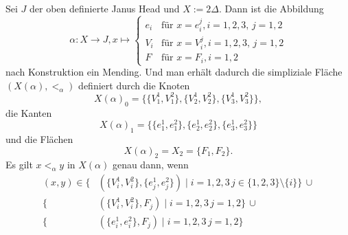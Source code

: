 \documentclass[12pt,titlepage]{article}
\begin{document}
  \begin{bsp}
  Sei $J$ der oben definierte Janus Head und $X:= 2\Delta$. Dann ist die Abbildung 
  \[
  \alpha: X \to J, x \mapsto 
  \begin{cases}
e_i & \text{für } x =e_i^j ,i=1,2,3,\,j=1,2\\
V_i &\text{für } x =V_i^j,i=1,2,3,\,j=1,2\\
F &\text{für } x=F_i , i=1,2 
\end{cases}
  \]
  nach Konstruktion ein Mending. Und man erhält dadurch die simpliziale Fläche $(X(\alpha),<_\alpha)$ definiert durch die Knoten
  \[
  X(\alpha)_0=\{\{V_1^1,V_1^2\},\{V_2^1,V_2^2\},\{V_3^1,V_3^2\}\},
  \]
  die Kanten
  \[
  X(\alpha)_1=\{\{e_1^1,e_1^2\},\{e_2^1,e_2^2\},\{e_3^1,e_3^2\}\}
  \]
  und die Flächen 
  \[
X(\alpha)_2=X_2=\{F_1,F_2\} .
  \]
  Es gilt $x<_{\alpha}y$ in $X(\alpha)$ genau dann, wenn
  \begin{align*}
 (x,y) \in \{&(\{V_i^1,V_i^2\}, \{e_j^1,e_j^2\})\mid i=1,2,3 \, j\in\{1,2,3\} \setminus \{i\}\}\, \cup\\
  \{&(\{V_i^1,V_i^2\}, F_j)\mid i=1,2,3 \, j=1,2 \} \,\cup\\
  \{&(\{e_i^1,e_i^2\}, F_j)\mid i=1,2,3 \, j=1,2 \} 
\end{align*}
 \end{bsp}
\end{document}
